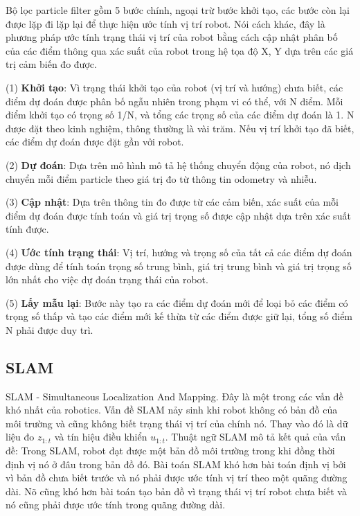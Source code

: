 Bộ lọc particle filter gồm 5 bước chính, ngoại trừ bước khởi tạo, các bước còn lại được lặp đi lặp lại để thực hiện ước tính vị trí robot. Nói cách khác, đây là phương pháp ước tính trạng thái vị trí của robot bằng cách cập nhật phân bố của các điểm thông qua xác suất của robot trong hệ tọa độ X, Y dựa trên các giá trị cảm biến đo được.

(1) \textbf{Khởi tạo}:
Vì trạng thái khởi tạo của robot (vị trí và hướng) chưa biết, các điểm dự đoán được phân bố ngẫu nhiên trong phạm vi có thể, với N điểm. Mỗi điểm khởi tạo có trọng số 1/N, và tổng các trọng số của các điểm dự đoán là 1. N được đặt theo kinh nghiệm, thông thường là vài trăm. Nếu vị trí khởi tạo đã biết, các điểm dự đoán được đặt gần vởi robot.

(2) \textbf{Dự đoán}: Dựa trên mô hình mô tả hệ thống chuyển động của robot, nó dịch chuyển mỗi điểm particle theo giá trị đo từ thông tin odometry và nhiễu.

(3) \textbf{Cập nhật}: Dựa trên thông tin đo được từ các cảm biến, xác suất của mỗi điểm dự đoán được tính toán và giá trị trọng số được cập nhật dựa trên xác suất tính được.

(4) \textbf{Ước tính trạng thái}: Vị trí, hướng và trọng số của tất cả các điểm dự đoán được dùng để tính toán trọng số trung bình, giá trị trung bình và giá trị trọng số lớn nhất cho việc dự đoán trạng thái của robot.

(5) \textbf{Lấy mẫu lại}: Bước này tạo ra các điểm dự đoán mới để loại bỏ các điểm có trọng số thấp và tạo các điểm mới kế thừa từ các điểm được giữ lại, tổng số điểm N phải được duy trì.

\subsection{SLAM}

SLAM - Simultaneous Localization And Mapping. Đây là một trong các vấn đề khó nhất của robotics. Vấn đề SLAM nảy sinh khi robot không có bản đồ của môi trường và cũng không biết trạng thái vị trí của chính nó. Thay vào đó là dữ liệu đo ${z}_{1:t}$ và tín hiệu điều khiển ${u}_{1:t}$. Thuật ngữ SLAM mô tả kết quả của vấn đề: Trong SLAM, robot đạt được một bản đồ môi trường trong khi đồng thời định vị nó ở đâu trong bản đồ đó. Bài toán SLAM khó hơn bài toán định vị bởi vì bản đồ chưa biết trước và nó phải được ước tính vị trí theo một quãng đường dài. Nõ cũng khó hơn bài toán tạo bản đồ vì trạng thái vị trí robot chưa biết và nó cũng phải được ước tính trong quãng đường dài.

